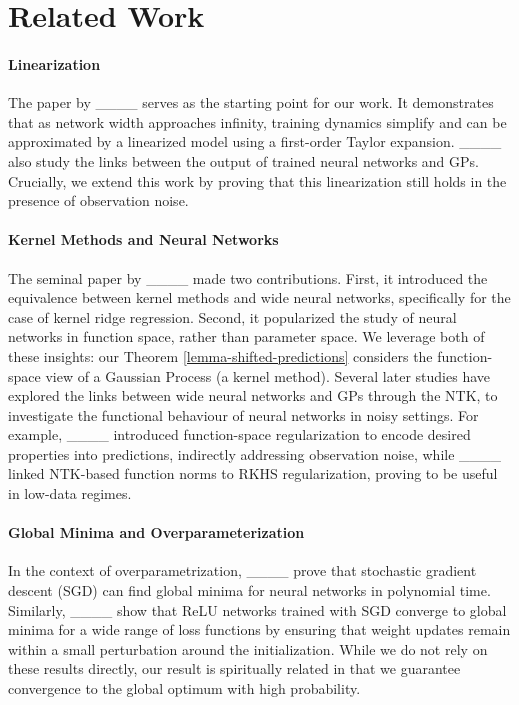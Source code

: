 \section{Related Work}
\paragraph{Linearization} The paper by ____ serves as the starting point for our work. It demonstrates that as network width approaches infinity, training dynamics simplify and can be approximated by a linearized model using a first-order Taylor expansion. ____ also study the links between the output of trained neural networks and GPs. Crucially, we extend this work by proving that this linearization still holds in the presence of observation noise.


\paragraph{Kernel Methods and Neural Networks} 
The seminal paper by ____ made two contributions. First, it introduced the equivalence between kernel methods and wide neural networks, specifically for the case of kernel ridge regression. Second, it popularized the study of neural networks in function space, rather than parameter space. We leverage both of these insights: our Theorem \ref{lemma-shifted-predictions} considers the function-space view of a Gaussian Process (a kernel method).  Several later studies have explored the links between wide neural networks and GPs through the NTK, to investigate the functional behaviour of neural networks in noisy settings. For example, ____ introduced function-space regularization to encode desired properties into predictions, indirectly addressing observation noise, while ____ linked NTK-based function norms to RKHS regularization, proving to be useful in low-data regimes.

\paragraph{Global Minima and Overparameterization} In the context of overparametrization, ____ prove that stochastic gradient descent (SGD) can find global minima for neural networks in polynomial time. Similarly, ____ show that ReLU networks trained with SGD converge to global minima for a wide range of loss functions by ensuring that weight updates remain within a small perturbation around the initialization. While we do not rely on these results directly, our result is spiritually related in that we guarantee convergence to the global optimum with high probability.

